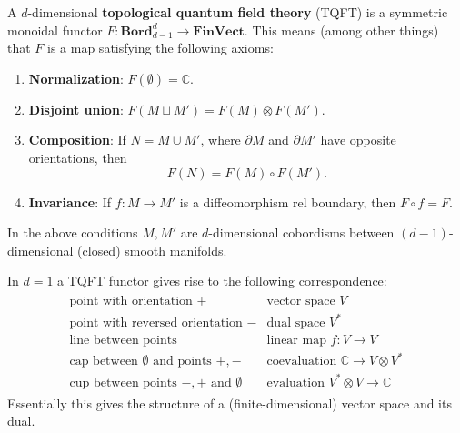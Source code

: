     \begin{axiom}
        A $d$-dimensional \textbf{topological quantum field theory} (TQFT) is a symmetric monoidal functor $F:\mathbf{Bord}_{d-1}^d\rightarrow\mathbf{FinVect}$. This means (among other things) that $F$ is a map satisfying the following axioms:
        \begin{enumerate}
            \item\textbf{Normalization}: $F(\emptyset)=\mathbb{C}$.
            \item\textbf{Disjoint union}: $F(M\sqcup M') = F(M)\otimes F(M')$.
            \item\textbf{Composition}: If $N=M\cup M'$, where $\partial M$ and $\partial M'$ have opposite orientations, then \[F(N) = F(M)\circ F(M').\]
            \item\textbf{Invariance}: If $f: M\rightarrow M'$ is a diffeomorphism rel boundary, then $F\circ f = F$.
        \end{enumerate}
        In the above conditions $M,M'$ are $d$-dimensional cobordisms between $(d-1)$-dimensional (closed) smooth manifolds.
    \end{axiom}

    \begin{example}[1D]
        In $d=1$ a TQFT functor gives rise to the following correspondence:
        \begin{gather*}
            \begin{array}{l|l}
                \text{point with orientation } + & \text{vector space } V\\
                \text{point with reversed orientation } - & \text{dual space }V^*\\
                \text{line between points} & \text{linear map }f:V\rightarrow V\\
                \text{cap between $\emptyset$ and points } +,- & \text{coevaluation } \mathbb{C}\rightarrow V\otimes V^*\\
                \text{cup between points $-,+$ and }\emptyset & \text{evaluation }V^*\otimes V\rightarrow\mathbb{C}
            \end{array}
        \end{gather*}
        Essentially this gives the structure of a (finite-dimensional) vector space and its dual.
    \end{example}

